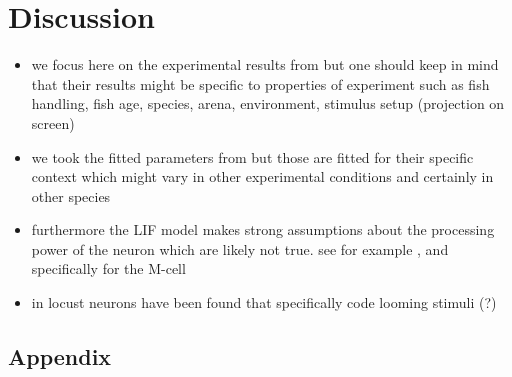 \documentclass[a4paper,10pt,hidelinks]{scrreprt}
\begin{document}
	\chapter{Discussion}
	\begin{itemize}
		\item we focus here on the experimental results from 
		\cite{Bhattacharyya2017} but one should keep in mind that their results 
		might be specific to properties of experiment such as fish handling, 
		fish age, species, arena, environment, stimulus setup (projection on 
		screen)
		\item we took the fitted parameters from \cite{Koyama2016} but those are fitted for their 
		specific context which might vary in other experimental conditions and certainly in other 
		species
		\item furthermore the LIF model makes strong assumptions about the processing power of the 
		neuron which are likely not true. see for example \cite{Koch2000}, and specifically for the 
		M-cell \cite{Medan2017}
		\item in locust neurons have been found that specifically code looming stimuli 
		\cite{Hatsopoulos1995} (?)
	\end{itemize}
	\newpage
	
	
	
	\newpage
	\appendix
	\section{Appendix}

	
\end{document}
